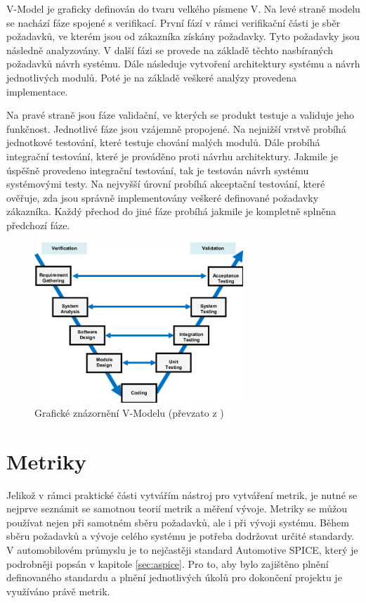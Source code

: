 \documentclass[czech,master,public,dept460,male,cpdeclaration,oneside]{diploma}
\begin{document}
V-Model je graficky definován do tvaru velkého písmene V. Na levé straně modelu se nachází fáze spojené s verifikací. První fází v rámci verifikační části je sběr požadavků, ve kterém jsou od zákazníka získány požadavky. Tyto požadavky jsou následně analyzovány. V další fázi se provede na základě těchto nasbíraných požadavků návrh systému. Dále následuje vytvoření architektury systému a návrh jednotlivých modulů. Poté je na základě veškeré analýzy provedena implementace.

Na pravé straně jsou fáze validační, ve kterých se produkt testuje a validuje jeho funkčnost. Jednotlivé fáze jsou vzájemně propojené. Na nejnižší vrstvě probíhá jednotkové testování, které testuje chování malých modulů. Dále probíhá integrační testování, které je prováděno proti návrhu architektury. Jakmile je úspěšně provedeno integrační testování, tak je testován návrh systému systémovými testy. Na nejvyšší úrovní probíhá akceptační testování, které ověřuje, zda jsou správně implementovány veškeré definované požadavky zákazníka. Každý přechod do jiné fáze probíhá jakmile je kompletně splněna předchozí fáze.

 \begin{figure}[!ht]
    \centering
    \includegraphics[width=0.7\textwidth]{Diplomka/Figures/v-model-in-software-testing.png}
    \caption{Grafické znázornění V-Modelu (převzato z \cite{ref:vmodel_Tierno2016})}
    \label{fig:v_model}
\end{figure}


\section{Metriky}
\label{sec:metrics}
Jelikož v rámci praktické části vytvářím nástroj pro vytváření metrik, je nutné se nejprve seznámit se samotnou teorií metrik a měření vývoje. Metriky se můžou používat nejen při samotném sběru požadavků, ale i při vývoji systému. Během sběru požadavků a vývoje celého systému je potřeba dodržovat určité standardy. V automobilovém průmyslu je to nejčastěji standard Automotive SPICE, který je podrobněji popsán v kapitole \ref{sec:aspice}. Pro to, aby bylo zajištěno plnění definovaného standardu a plnění jednotlivých úkolů pro dokončení projektu je využíváno právě metrik.
\end{document}

